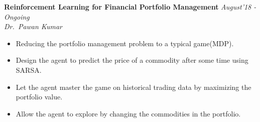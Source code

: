 \documentclass[10pt]{article}
\newenvironment{changemargin}[2]{%
    \begin{list}{}{%
            \setlength{\topsep}{0pt}%
            \setlength{\leftmargin}{#1}%
            \setlength{\rightmargin}{#2}%
            \setlength{\listparindent}{\parindent}%
        \setlength{\itemindent}{\parindent}%
            \setlength{\parsep}{\parskip}%
        }%
\item[]}{\end{list}
}
\newenvironment{body} {
    \vspace*{-16pt}
    \begin{changemargin}{-0.6in}{-0.65in}
    }   
    {\end{changemargin}
}
\begin{document}

\begin{body}
    \vspace{14pt}
    \textbf{Reinforcement Learning for Financial Portfolio Management} \hfill \emph{August'18 - Ongoing}\\
    \emph{Dr.~Pawan Kumar}
    \begin{itemize}
        \item{Reducing the portfolio management problem to a typical game(MDP).}
        \item{Design the agent to predict the price of a commodity after some time using SARSA.}
        \item{Let the agent master the game on historical trading data by maximizing the portfolio value.}
        \item{Allow the agent to explore by changing the commodities in the portfolio.}
    \end{itemize}
    \smallskip 
\end{body}

\end{document}
